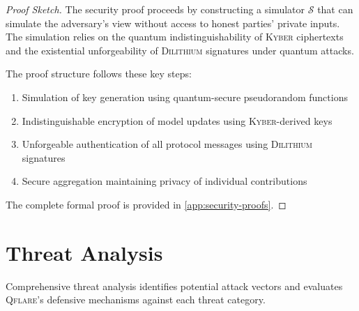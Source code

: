 \documentclass[12pt,a4paper,twoside]{book}
\newcommand{\qflare}{\textsc{Qflare}}
\newcommand{\kyber}{\textsc{Kyber}}
\newcommand{\dilithium}{\textsc{Dilithium}}
\begin{document}
\begin{proof}[Proof Sketch]
The security proof proceeds by constructing a simulator $\mathcal{S}$ that can simulate the adversary's view without access to honest parties' private inputs. The simulation relies on the quantum indistinguishability of \kyber{} ciphertexts and the existential unforgeability of \dilithium{} signatures under quantum attacks.

The proof structure follows these key steps:
\begin{enumerate}
\item Simulation of key generation using quantum-secure pseudorandom functions
\item Indistinguishable encryption of model updates using \kyber{}-derived keys
\item Unforgeable authentication of all protocol messages using \dilithium{} signatures
\item Secure aggregation maintaining privacy of individual contributions
\end{enumerate}

The complete formal proof is provided in \cref{app:security-proofs}.
\end{proof}

\section{Threat Analysis}
\label{sec:threat-analysis}

Comprehensive threat analysis identifies potential attack vectors and evaluates \qflare{}'s defensive mechanisms against each threat category.
\end{document}
